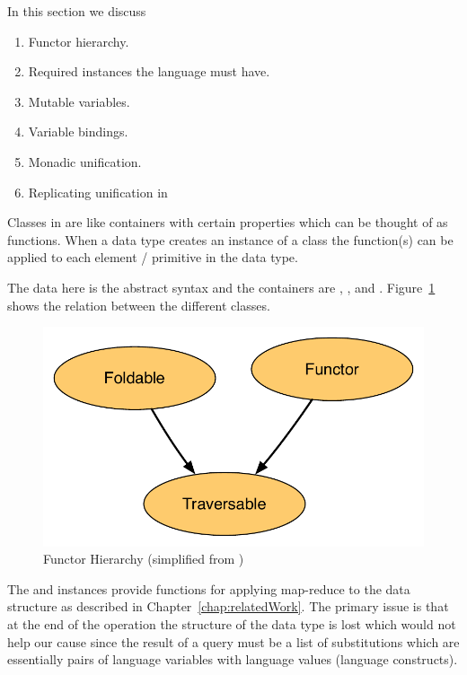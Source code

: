 \documentclass[thesis-solanki.tex]{subfiles}
\begin{document}
In this section we discuss
\begin{enumerate}
\item Functor hierarchy.

\item Required instances the language must have.

\item Mutable variables.

\item Variable bindings.

\item Monadic unification.

\item Replicating  unification in 
\end{enumerate}

Classes in  are like containers with certain properties which can be thought of as functions.
When a data type creates an instance of a class the function(s) can be applied to each element / primitive in the
data type.


The data here is the  abstract syntax and the containers are
, , and .
Figure~\ref{fig:Functor Hierarchy} shows the relation between the different classes.

\begin{figure}[th]
\centering
\includegraphics[scale = 0.7]{FunctorHierarchy.pdf}
\caption{Functor Hierarchy (simplified from \cite{website:foldablenadtraversable})}
\label{fig:Functor Hierarchy}
\end{figure}

The  and  instances provide functions for applying map-reduce to the data structure as described in Chapter~\ref{chap:relatedWork}.
The primary issue is that at the end of the operation the structure of the data type is lost which would not help
our cause since the result of a query must be a list of substitutions which are essentially pairs of language
variables with language values (language constructs).
\end{document}
